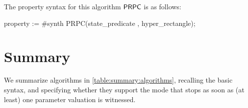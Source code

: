 The property syntax for this algorithm $\mathsf{PRPC}$ is as follows:

\begin{IMITATORproperty}
property := #synth PRPC(state_predicate , hyper_rectangle);
\end{IMITATORproperty}



\section{Summary}\label{ss:mode:summary}

We summarize algorithms in \cref{table:summary:algorithms}, recalling the basic syntax, and specifying whether they support the  mode that stops as soon as (at least) one parameter valuation is witnessed.

